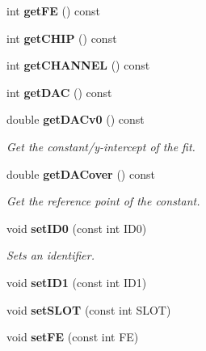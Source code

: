 \begin{DoxyCompactItemize}
\item 
int {\bfseries getFE} () const \label{classCALICE_1_1ScECALMapping_aef4cc956fc4fe091ca4162b6914f9677}

\item 
int {\bfseries getCHIP} () const \label{classCALICE_1_1ScECALMapping_a86e6306613f37baa93fdb527b3179971}

\item 
int {\bfseries getCHANNEL} () const \label{classCALICE_1_1ScECALMapping_ad711729998e617e9748d3b92a629fd4f}

\item 
int {\bfseries getDAC} () const \label{classCALICE_1_1ScECALMapping_a000df6f6ae36d1c01d34d61fd3eb0875}

\item 
double {\bf getDACv0} () const \label{classCALICE_1_1ScECALMapping_a9124cfbaa860f797b305dd68f6120efb}

\begin{DoxyCompactList}\small\item\em Get the constant/y-\/intercept of the fit. \item\end{DoxyCompactList}\item 
double {\bf getDACover} () const \label{classCALICE_1_1ScECALMapping_a06ff1a5f992e66625414d402f03701a3}

\begin{DoxyCompactList}\small\item\em Get the reference point of the constant. \item\end{DoxyCompactList}\item 
void {\bf setID0} (const int ID0)\label{classCALICE_1_1ScECALMapping_a92e8ef73829de91a3eea0d28e7feba98}

\begin{DoxyCompactList}\small\item\em Sets an identifier. \item\end{DoxyCompactList}\item 
void {\bfseries setID1} (const int ID1)\label{classCALICE_1_1ScECALMapping_ad15de16ad8eec86368a6056870cfd930}

\item 
void {\bfseries setSLOT} (const int SLOT)\label{classCALICE_1_1ScECALMapping_afba73e22a3fa004b69858b3da60ff982}

\item 
void {\bfseries setFE} (const int FE)\label{classCALICE_1_1ScECALMapping_abfd33cf61c46b9ebdf66b6af5e586508}


\end{DoxyCompactItemize}
